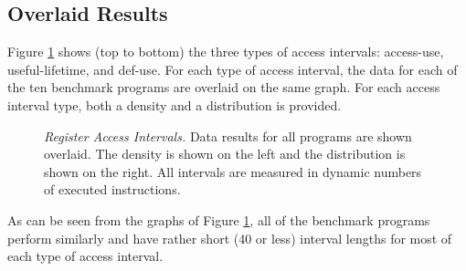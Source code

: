 



\subsection{Overlaid Results}
%
Figure \ref{fig:a_over} shows (top to bottom)
the three types of access intervals:
access-use, useful-lifetime, and def-use.
For each type of access interval, the data for each of the
ten benchmark programs are overlaid on the same graph.
For each access interval type, both a density 
and a distribution is provided.
%
\begin{figure}[tb]
\centering
{}
\caption{{\em Register Access Intervals.} 
Data results for all programs are shown overlaid.
The density is shown on the left and the distribution is shown
on the right.
All intervals are measured in dynamic numbers of executed instructions.}
\label{fig:a_over}
\end{figure}
%
As can be seen from the graphs of Figure \ref{fig:a_over},
all of the benchmark programs perform similarly and have
rather short (40 or less) interval lengths for most of each type
of access interval.
%
